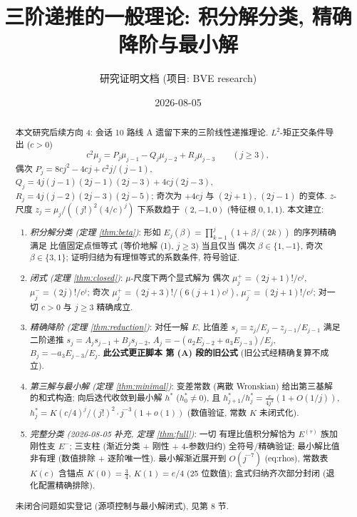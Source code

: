 \documentclass[UTF8]{ctexart}
\title{三阶递推的一般理论: 积分解分类, 精确降阶与最小解}
\author{研究证明文档 (项目: BVE research)}
\date{2026-08-05}
\begin{document}
\maketitle

\begin{abstract}
本文研究后续方向 4: 会话 10 路线 A 遗留下来的三阶线性递推理论.
$L^2$-矩正交条件导出 ($c>0$)
\begin{equation}
	c^2 \mu_j = P_j \mu_{j-1} - Q_j \mu_{j-2} + R_j \mu_{j-3}
	\qquad (j \geq 3),
\end{equation}
偶次 $P_j = 8cj^2 - 4cj + c^2 j/(j-1)$, $Q_j = 4j(j-1)(2j-1)(2j-3) + 4cj(2j-3)$,
$R_j = 4j(j-2)(2j-3)(2j-5)$; 奇次为 $+4cj$ 与 $(2j+1)$, $(2j-1)$ 的变体.
$z$-尺度 $z_j = \mu_j/((j!)^2 (4/c)^j)$ 下系数趋于 $(2,-1,0)$
(特征根 $0, 1, 1$). 本文建立:
\begin{enumerate}
	\item \emph{积分解分类 (定理 \ref{thm:beta})}: 形如
		$E_j(\beta) = \prod_{k=1}^j (1+\beta/(2k))$ 的序列精确满足
		比值固定点恒等式 (等价地解 (1), $j \geq 3$) 当且仅当
		偶次 $\beta \in \{1, -1\}$, 奇次 $\beta \in \{3, 1\}$;
		证明归结为有理恒等式的系数条件, 符号验证.
	\item \emph{闭式 (定理 \ref{thm:closed})}: $\mu$-尺度下两个显式解为
		偶次 $\mu_j^+ = (2j+1)!/c^j$, $\mu_j^- = (2j)!/c^j$;
		奇次 $\mu_j^+ = (2j+3)!/(6(j+1)c^j)$, $\mu_j^- = (2j+1)!/c^j$;
		对一切 $c > 0$ 与 $j \geq 3$ 精确成立.
	\item \emph{精确降阶 (定理 \ref{thm:reduction})}: 对任一解 $E$,
		比值差 $s_j = z_j/E_j - z_{j-1}/E_{j-1}$ 满足二阶递推
		$s_j = A_j s_{j-1} + B_j s_{j-2}$, $A_j = -(a_2 E_{j-2} + a_3 E_{j-3})/E_j$,
		$B_j = -a_3 E_{j-3}/E_j$. \textbf{此公式更正脚本
		 第 (A) 段的旧公式} (旧公式经精确复算不成立).
	\item \emph{第三解与最小解 (定理 \ref{thm:minimal})}: 变差常数 (离散 Wronskian)
		给出第三基解的和式构造; 向后迭代收敛到最小解 $h^*$ ($h^*_0 \neq 0$),
		且 $h^*_{j+1}/h^*_j = \frac{c}{4j^2}(1+O(1/j))$,
		$h^*_j = K(c/4)^j/(j!)^2 \cdot j^{-3}(1+o(1))$ (数值验证, 常数 $K$ 未闭式化).
	\item \emph{完整分类 (2026-08-05 补充, 定理 \ref{thm:full})}: 一切
		有理比值积分解恰为 $E^{(\tau)}$ 族加刚性支 $E^-$; 三支柱
		(渐近分类 + 刚性 + 4-参数归约) 全符号/精确验证; 最小解比值
		非有理 (数值排除 + 逐阶唯一性). 最小解渐近展开到 $O(j^{-7})$
		(eq:rhos), 常数表 $K(c)$ 含锚点 $K(0)=\tfrac34$, $K(1)=e/4$
		(25 位数值); 盒式归纳齐次部分封闭 (退化配置精确排除).
\end{enumerate}
未闭合问题如实登记 (源项控制与最小解闭式), 见第 8 节.
\end{abstract}
\end{document}

